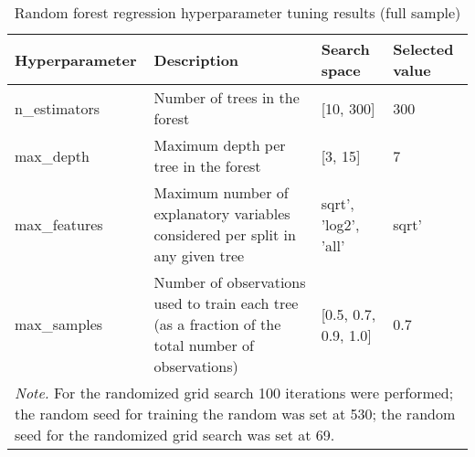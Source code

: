 \begin{table}[htbp]
    \begin{spacing}{1.5}
    \centering
    \small
    \caption{Random forest regression hyperparameter tuning results (full sample)}
    \label{tab:hyperparameter_tuning_results_rfr_full_sample}
    \begin{tabularx}{\textwidth}{p{3cm}p{6cm}p{3cm}p{2cm}}
        \toprule
        \toprule
        \textbf{Hyperparameter} & \textbf{Description} & \textbf{Search space} & \multicolumn{1}{l}{\textbf{Selected value}} \\
        \midrule
        n\_estimators & Number of trees in the forest & [10, 300] & 300 \\
        max\_depth & Maximum depth per tree in the forest & [3, 15] & 7 \\
        max\_features & Maximum number of explanatory variables considered per split in any given tree & sqrt', 'log2', 'all' & \multicolumn{1}{l}{sqrt'} \\
        max\_samples & Number of observations used to train each tree (as a fraction of the total number of observations) & [0.5, 0.7, 0.9, 1.0] & 0.7 \\
        \bottomrule
        \bottomrule
        \multicolumn{4}{X}{\footnotesize\textit{Note.} For the randomized grid search 100 iterations were performed; the random seed for training the random was set at 530; the random seed for the randomized grid search was set at 69.}
    \end{tabularx}
    \end{spacing}
\end{table}

